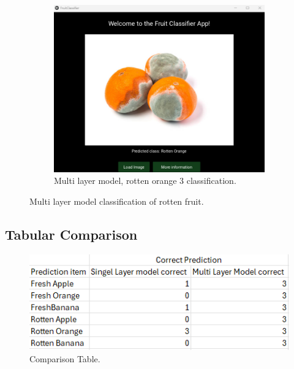 \documentclass[conference]{IEEEtran}
\begin{document}
\begin{figure}[h]
    \begin{subfigure}[b]{0.48\linewidth}
        \centering
        \includegraphics[width=\linewidth]{Mlayer orageR3.png}
        \caption{Multi layer model, rotten orange 3 classification.}
        \label{figFB}
    \end{subfigure}
    \caption{Multi layer model classification of rotten fruit.}
    \label{FigMR}
\end{figure}
\clearpage

\subsection{Tabular Comparison}

\begin{figure}[h]
    \centering
    \includegraphics[width=\linewidth]{Ek wil huil.png}
    \caption{Comparison Table.}
    \label{figHuil}
\end{figure}
\end{document}
